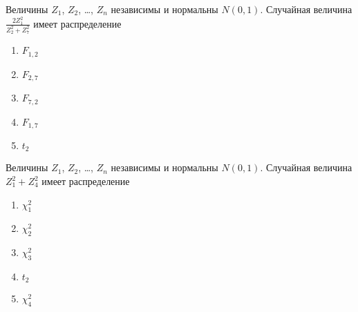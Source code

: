 \documentclass[t]{beamer}
\begin{document}
 \begin{frame} \label{37} 
\begin{block}{37} 

Величины $Z_1$, $Z_2$, \ldots, $Z_n$ независимы и нормальны $N(0,1)$. Случайная величина $\frac{2Z_1^2}{Z_2^2+Z_7^2}$ имеет распределение
 


 \end{block} 
\begin{enumerate} 
\item[] \hyperlink{37-Yes}{\beamergotobutton{} $F_{1,2}$}
\item[] \hyperlink{37-No}{\beamergotobutton{} $F_{2,7}$}
\item[] \hyperlink{37-No}{\beamergotobutton{} $F_{7,2}$}
\item[] \hyperlink{37-No}{\beamergotobutton{} $F_{1,7}$}
\item[] \hyperlink{37-No}{\beamergotobutton{} $t_2$}
\end{enumerate} 
\end{frame} 


 \begin{frame} \label{38} 
\begin{block}{38} 

Величины $Z_1$, $Z_2$, \ldots, $Z_n$ независимы и нормальны $N(0,1)$. Случайная величина $Z_1^2+Z_4^2$ имеет распределение
 


 \end{block} 
\begin{enumerate} 
\item[] \hyperlink{38-No}{\beamergotobutton{} $\chi^2_1$}
\item[] \hyperlink{38-Yes}{\beamergotobutton{} $\chi^2_2$}
\item[] \hyperlink{38-No}{\beamergotobutton{} $\chi^2_3$}
\item[] \hyperlink{38-No}{\beamergotobutton{} $t_2$}
\item[] \hyperlink{38-No}{\beamergotobutton{} $\chi^2_4$}
\end{enumerate} 
\end{frame} 
\end{document}
